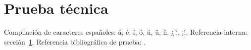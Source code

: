\documentclass{article}
\begin{document}
\section{Prueba técnica}\label{sec:prueba}
Compilación de caracteres españoles: á, é, í, ó, ú, ü, ñ, ¿?, ¡!.
Referencia interna: sección~\ref{sec:prueba}.
Referencia bibliográfica de prueba: \cite{smoke}.
\printbibliography
\end{document}
